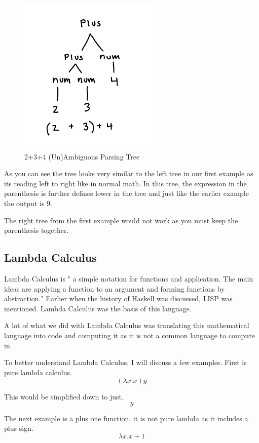 \documentclass{article}
\begin{document}
\medskip\noindent 
\begin{figure}[htp]
    \centering
    \includegraphics[width=7cm]{IMG_0654.jpg}
    \caption{2+3+4 (Un)Ambiguous Parsing Tree}
    \label{fig:Parsing Tree 3}
\end{figure}

\medskip\noindent 
As you can see the tree looks very similar to the left tree in our first example as its reading left to right like in normal math. In this tree, the expression in the parenthesis is further defines lower in the tree and just like the earlier example the output is 9. 

\medskip\noindent
The right tree from the first example would not work as you must keep the parenthesis together. 

\subsection{Lambda Calculus}

Lambda Calculus is " a simple notation for functions and application. The main ideas are applying a function to an argument and forming functions by abstraction."\cite{LA} Earlier when the history of Haskell was discussed, LISP was mentioned. Lambda Calculus was the basis of this language. 

\medskip\noindent
A lot of what we did with Lambda Calculus was translating this mathematical language into code and computing it as it is not a common language to compute in.

\medskip\noindent
To better understand Lambda Calculus, I will discuss a few examples. First is pure lambda calculus. 
$$ (\lambda x.x)y$$

\medskip\noindent
This would be simplified down to just.
$$y$$

\medskip\noindent
The next example is a plus one function, it is not pure lambda as it includes a plus sign.
$$ \lambda x.x+1$$
\end{document}
